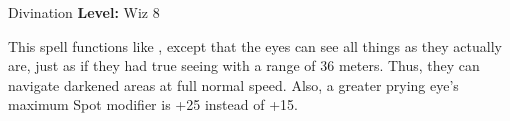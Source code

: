{Divination}
{
	\textbf{Level:}
	Wiz 8\\
}
{
	This spell functions like , except that the eyes can see all things as they actually are, just as if they had true seeing with a range of 36 meters. Thus, they can navigate darkened areas at full normal speed. Also, a greater prying eye's maximum Spot modifier is +25 instead of +15.

}
